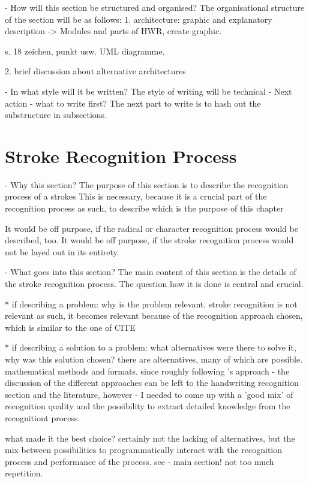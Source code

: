 - How will this section be structured and organised?
  The organisational structure of the section will be as follows:
  1. architecture: graphic and explanatory description
  -> Modules and parts of HWR, create graphic.

  s. 18 zeichen, punkt usw. UML diagramme.
     
  2. brief discussion about alternative architectures

- In what style will it be written?
  The style of writing will be technical
- Next action - what to write first?
  The next part to write is to hash out the substructure in subsections.


\section{Stroke Recognition Process}
\label{sec:hwre:strokerecognitionprocess}

- Why this section? 
  The purpose of this section is to describe the recognition process of a strokes
  This is necessary, because it is a crucial part of the recognition process
  as such, to describe which is the purpose of this chapter

  It would be off purpose, if the radical or character recognition process 
  would be described, too.
  It would be off purpose, if the stroke recognition process would not be 
  layed out in its entirety.

- What goes into this section?
  The main content of this section is the details of the stroke recognition
  process. The question how it is done is central and crucial.

  * if describing a problem: why is the problem relevant.
    stroke recognition is not relevant as such, it becomes relevant because
    of the recognition approach chosen, which is similar to the one of CITE

  * if describing a solution to a problem: what alternatives were
    there to solve it, why was this solution chosen? 
    there are alternatives, many of which are possible. mathematical methods 
    and formats. since roughly following 's
    \citeyear{Nakagawa2008} approach - the discussion of the different 
    approaches can be left to the handwriting recognition section and the 
    literature, however - I needed to come up with a 'good mix' of 
    recognition quality and the possibility to extract detailed knowledge 
    from the recognitiont process.
     
    what made it the best choice? 
    certainly not the lacking of alternatives, but the mix between 
    possibilities to programmatically interact with the recognition process
    and performance of the process.
    see - main section! not too much repetition.


